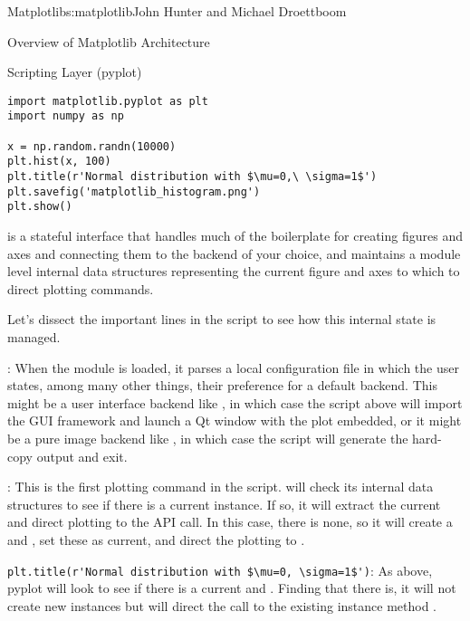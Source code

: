 \begin{aosachapter}{Matplotlib}{s:matplotlib}{John Hunter and Michael Droettboom}
\begin{aosasect1}{Overview of Matplotlib Architecture}
\begin{aosasect2}{Scripting Layer (pyplot)}
\begin{verbatim}
import matplotlib.pyplot as plt
import numpy as np

x = np.random.randn(10000)
plt.hist(x, 100)
plt.title(r'Normal distribution with $\mu=0,\ \sigma=1$')
plt.savefig('matplotlib_histogram.png')
plt.show()
\end{verbatim}


 is a stateful interface that handles much of the boilerplate
for creating figures and axes and connecting them to the backend of
your choice, and maintains a module level internal data structures
representing the current figure and axes to which to direct plotting
commands.

Let's dissect the important lines in the script to see how this
internal state is managed.

\begin{aosaitemize}

\item {}: When the  module
  is loaded, it parses a local configuration file in which the user
  states, among many other things, their preference for a default
  backend.  This might be a user interface backend like ,
  in which case the script above will import the GUI framework and
  launch a Qt window with the plot embedded, or it might be a pure
  image backend like , in which case the script will
  generate the hard-copy output and exit.

\item {}: This is the first plotting command in
  the script.   will check its internal data structures to see
  if there is a current  instance.  If so, it will
  extract the current  and direct plotting to the
   API call.  In this case, there is none, so it will
  create a  and , set these as current, and
  direct the plotting to .

\item \verb+plt.title(r'Normal distribution with $\mu=0, \sigma=1$')+:
  As above, pyplot will look to see if there is a
  current  and .  Finding that there is, it
  will not create new instances but will direct the call to the
  existing  instance method .


\end{aosaitemize}
\end{aosasect2}
\end{aosasect1}
\end{aosachapter}
